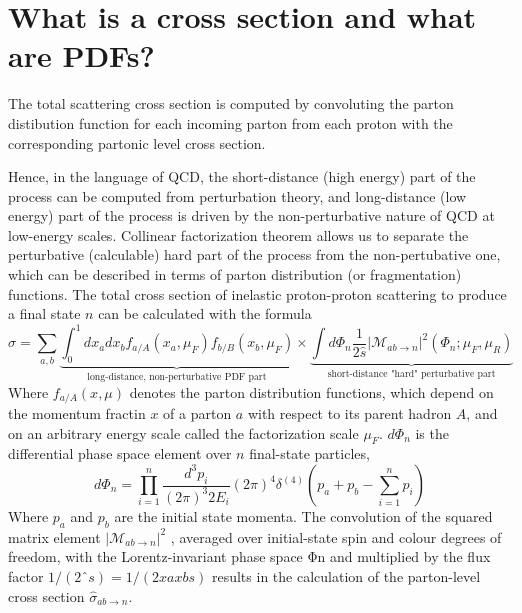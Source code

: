 \section{What is a cross section and what are PDFs?}
The total scattering cross section is computed by convoluting the parton distibution function for each incoming parton from each proton with the corresponding partonic level cross section.

Hence, in the language of QCD, the short-distance (high energy) part of the process can be computed from perturbation theory, and long-distance (low energy) part of the process is driven by the non-perturbative nature of QCD at low-energy scales. Collinear factorization theorem allows us to separate the perturbative (calculable) hard part of the process from the non-pertubative one, which can be described in terms of parton distribution (or fragmentation) functions. The total cross section of inelastic proton-proton scattering to produce a final state $n$ can be calculated with the formula
\begin{equation}
    \sigma = \sum_{a, b} \underbrace{\int_{0}^{1} d x_{a} d x_{b} f_{a/A}\left(x_{a}, \mu_{F}\right) f_{b/B}\left(x_{b}, \mu_{F}\right)}_{\text{long-distance, non-perturbative PDF part}} \times \underbrace{\int d \Phi_{n}  \frac{1}{2 \hat{s}}\left|\mathcal{M}_{a b \rightarrow n}\right|^{2}\left(\Phi_{n} ; \mu_{F}, \mu_{R}\right)}_{\text{short-distance "hard" perturbative part}}
    \label{QCD_master}
\end{equation}
Where $f_{a/A}(x, \mu)$ denotes the parton distribution functions, which depend on the momentum fractin $x$ of a parton $a$ with respect to its parent hadron $A$, and on an arbitrary energy scale called the factorization scale $\mu_F$. $d \Phi_{n}$ is the differential phase space element over $n$ final-state particles,
\begin{equation}
    d \Phi_{n}=\prod_{i=1}^{n} \frac{d^{3} p_{i}}{(2 \pi)^{3} 2 E_{i}}(2 \pi)^{4} \delta^{(4)}\left(p_{a}+p_{b}-\sum_{i=1}^{n} p_{i}\right)
\end{equation}
Where $p_a$ and $p_b$ are the initial state momenta. 
The convolution of the squared matrix element $\left|\mathcal{M}_{a b \rightarrow n}\right|^{2}$ 
, averaged over initial-state spin and colour degrees of freedom, with the
Lorentz-invariant phase space Φn and multiplied by the flux factor $ 1/(2ˆs) = 1/(2xaxbs)$
results in the calculation of the parton-level cross section $\hat{\sigma}_{ab→n}$. 


